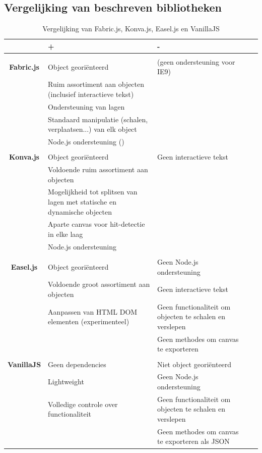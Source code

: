 \newpage
\subsection{Vergelijking van beschreven bibliotheken}

\begin{table}[ht!]
	\begin{center}
	\begin{tabular}[c]{clllc}
	\hline
	 & + & - \\
	\hline
						& & \\
	\textbf{Fabric.js}  & Object geori\"{e}nteerd &  (geen ondersteuning voor IE9)\\
						& Ruim assortiment aan objecten (inclusief interactieve tekst) &  \\
						& Ondersteuning van lagen &  \\
						& Standaard manipulatie (schalen, verplaatsen...) van elk object &  \\
						& Node.js ondersteuning () &  \\
						& & \\
	\textbf{Konva.js} 	& Object geori\"{e}nteerd & Geen interactieve tekst \\
						& Voldoende ruim assortiment aan objecten &  \\
						& Mogelijkheid tot splitsen van lagen met statische en dynamische objecten &  \\
						& Aparte canvas voor hit-detectie in elke laag &  \\
						& Node.js ondersteuning & \\
						& & \\
	\textbf{Easel.js} 	& Object geori\"{e}nteerd & Geen Node.js ondersteuning \\
						& Voldoende groot assortiment aan objecten & Geen interactieve tekst \\
						& Aanpassen van HTML DOM elementen (experimenteel)&  Geen functionaliteit om objecten te schalen en verslepen\\
						& &  Geen methodes om canvas te exporteren\\
						& & \\
	\textbf{VanillaJS} 	& Geen dependencies & Niet object geori\"{e}nteerd \\
						& Lightweight & Geen Node.js ondersteuning \\
						& Volledige controle over functionaliteit &  Geen functionaliteit om objecten te schalen en verslepen\\
						& &  Geen methodes om canvas te exporteren als JSON\\
	\hline
	\end{tabular}
	\caption{Vergelijking van Fabric.js, Konva.js, Easel.js en VanillaJS}
	\end{center}
	\end{table} 
	
